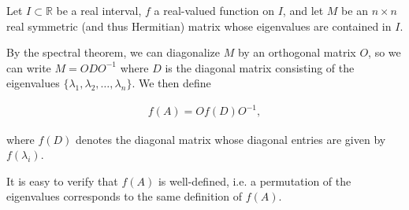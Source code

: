 \documentclass[12pt]{article}
\newcommand{\<}{\langle}
\renewcommand{\>}{\rangle}
\begin{document}
Let $I\subset\mathbb{R}$ be a real interval, $f$ a real-valued function on $I$, and let $M$ be an $n\times n$ real symmetric (and thus Hermitian) matrix whose eigenvalues are contained in $I$.

By the spectral theorem, we can diagonalize $M$ by an orthogonal matrix $O$, so we can write $M=ODO^{-1}$ where $D$ is the diagonal matrix consisting of the eigenvalues $\{\lambda_1,\lambda_2,\ldots,\lambda_n\}$.  We then define

\begin{align*}
f(A)=Of(D)O^{-1},
\end{align*}

where $f(D)$ denotes the diagonal matrix whose diagonal entries are given by $f(\lambda_i)$.

It is easy to verify that $f(A)$ is well-defined, i.e. a permutation of the eigenvalues corresponds to the same definition of $f(A)$.
\end{document}
